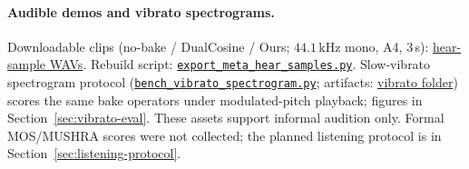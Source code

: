 
\paragraph{Audible demos and vibrato spectrograms.}
Downloadable clips (no-bake / DualCosine / Ours; $44.1$\,kHz mono, A4, $3$\,s):
\href{https://github.com/reeldemo/reelsynth/tree/main/brand/artifacts/meta_approach_compare/hear_samples}{hear-sample WAVs}.
Rebuild script:
\href{https://github.com/reeldemo/reelsynth/blob/main/scripts/export_meta_hear_samples.py}{\texttt{export\_meta\_hear\_samples.py}}.
Slow-vibrato spectrogram protocol
(\href{https://github.com/reeldemo/reelsynth/blob/main/scripts/bench_vibrato_spectrogram.py}{\texttt{bench\_vibrato\_spectrogram.py}};
artifacts:
\href{https://github.com/reeldemo/reelsynth/tree/main/brand/artifacts/vibrato_spectrogram}{vibrato folder})
scores the same bake operators under modulated-pitch playback; figures in Section~\ref{sec:vibrato-eval}.
These assets support informal audition only.
Formal MOS/MUSHRA scores were not collected; the planned listening protocol is in Section~\ref{sec:listening-protocol}.
